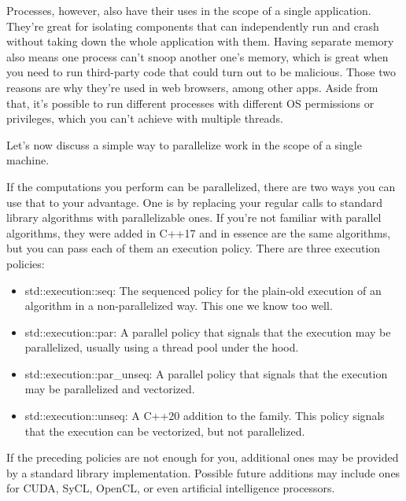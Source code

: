 Processes, however, also have their uses in the scope of a single application. They're great for isolating components that can independently run and crash without taking down the whole application with them. Having separate memory also means one process can't snoop another one's memory, which is great when you need to run third-party code that could turn out to be malicious. Those two reasons are why they're used in web browsers, among other apps. Aside from that, it's possible to run different processes with different OS permissions or privileges, which you can't achieve with multiple threads.

Let's now discuss a simple way to parallelize work in the scope of a single machine.


If the computations you perform can be parallelized, there are two ways you can use that to your advantage. One is by replacing your regular calls to standard library algorithms with parallelizable ones. If you're not familiar with parallel algorithms, they were added in C++17 and in essence are the same algorithms, but you can pass each of them an execution policy. There are three execution policies:

\begin{itemize}
\item 
std::execution::seq: The sequenced policy for the plain-old execution of an algorithm in a non-parallelized way. This one we know too well.

\item
std::execution::par: A parallel policy that signals that the execution may be parallelized, usually using a thread pool under the hood.

\item
std::execution::par\_unseq: A parallel policy that signals that the execution may be parallelized and vectorized.

\item
std::execution::unseq: A C++20 addition to the family. This policy signals that the execution can be vectorized, but not parallelized.
\end{itemize}

If the preceding policies are not enough for you, additional ones may be provided by a standard library implementation. Possible future additions may include ones for CUDA, SyCL, OpenCL, or even artificial intelligence processors.

